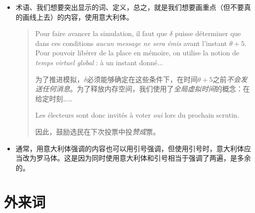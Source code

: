 \begin{itemize}
    \item 术语、我们想要突出显示的词、定义，总之，就是我们想要画重点（但不要真的画线上去）的内容，使用意大利体。\\
    \begin{quote}  
        Pour faire avancer la simulation, il faut que $\delta$ puisse déterminer que dans ces conditions \emph{aucun message ne sera émis} avant l'instant $\theta + 5$. Pour pouvoir libérer de la place en mémoire, on utilise la notion de \emph{temps virtuel global} : à un instant donné...
        \begin{bil}
            为了推进模拟，$\delta$必须能够确定在这些条件下，在时间$\theta + 5$之前\emph{不会发送任何消息}。为了释放内存空间，我们使用了\emph{全局虚拟时间}的概念：在给定时刻……
        \end{bil}
        
        Les électeurs sont donc invités à voter \emph{oui} lors du prochain scrutin.
        \begin{bil}
            因此，鼓励选民在下次投票中投\emph{赞成}票。
        \end{bil}
    \end{quote}
    \item 通常，用意大利体强调的内容也可以用引号强调，但使用引号时，意大利体应当改为罗马体。这是因为同时使用意大利体和引号相当于强调了两遍，是多余的。
\end{itemize}

\section{外来词}\label{sec4.6}

